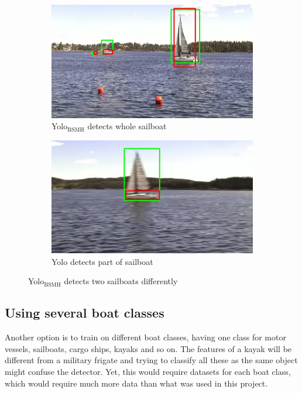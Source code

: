 \begin{figure}[h!]
\begin{subfigure}{.5\textwidth}
  \centering
  \includegraphics[width=0.8\linewidth]{discussion/sailboat/selected_06_25_frame0349.jpg}
  \caption{Yolo$_{\text{BSMH}}$ detects whole sailboat}
  \label{fig:yolo3_sailboat_whol}
\end{subfigure}%
\begin{subfigure}{.5\textwidth}
  \centering
  \includegraphics[width=.8\linewidth]{discussion/sailboat/selected_06_25_frame0340.jpg}
  \caption{Yolo detects part of sailboat}
  \label{fig:yolo3_sailboat_part}
\end{subfigure}
\caption{Yolo$_{\text{BSMH}}$ detects two sailboats differently}
\label{fig:yolo3_sailboat}
\end{figure}


\subsection{Using several boat classes}
Another option is to train on different boat classes, having one class for motor vessels, sailboats, cargo ships, kayaks and so on. The features of a kayak will be different from a military frigate and trying to classify all these as the same object might confuse the detector. Yet, this would require datasets for each boat class, which would require much more data than what was used in this project.

